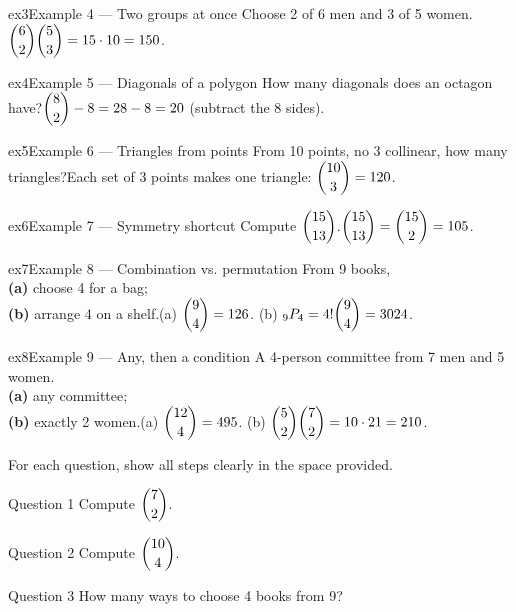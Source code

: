 \documentclass[11pt]{article}
\begin{document}
\begin{example}{ex3}{Example 4 --- Two groups at once}
Choose 2 of 6 men and 3 of 5 women.\soln $\dbinom{6}{2}\dbinom{5}{3}=15\cdot10=150$.
\end{example}

\begin{example}{ex4}{Example 5 --- Diagonals of a polygon}
How many diagonals does an octagon have?\soln $\dbinom{8}{2}-8=28-8=20$ (subtract the 8 sides).
\end{example}

\begin{example}{ex5}{Example 6 --- Triangles from points}
From 10 points, no 3 collinear, how many triangles?\soln Each set of 3 points makes one triangle: $\dbinom{10}{3}=120$.
\end{example}

\begin{example}{ex6}{Example 7 --- Symmetry shortcut}
Compute $\dbinom{15}{13}$.\soln $\dbinom{15}{13}=\dbinom{15}{2}=105$.
\end{example}

\begin{example}{ex7}{Example 8 --- Combination vs. permutation}
From 9 books, \\ \textbf{(a)} choose 4 for a bag; \\ \textbf{(b)} arrange 4 on a shelf.\soln (a) $\dbinom{9}{4}=126$. (b) $_9P_4=4!\dbinom{9}{4}=3024$.
\end{example}

\begin{example}{ex8}{Example 9 --- Any, then a condition}
A 4-person committee from 7 men and 5 women. \\ \textbf{(a)} any committee; \\ \textbf{(b)} exactly 2 women.\soln (a) $\dbinom{12}{4}=495$. (b) $\dbinom{5}{2}\dbinom{7}{2}=10\cdot21=210$.
\end{example}

\clearpage
{}
For each question, show all steps clearly in the space provided.

\begin{qbox}{Question 1}
Compute $\dbinom{7}{2}$.\workspace{2.4cm}
\end{qbox}

\begin{qbox}{Question 2}
Compute $\dbinom{10}{4}$.\workspace{2.4cm}
\end{qbox}

\begin{qbox}{Question 3}
How many ways to choose 4 books from 9?\workspace{2.4cm}
\end{qbox}
\end{document}
